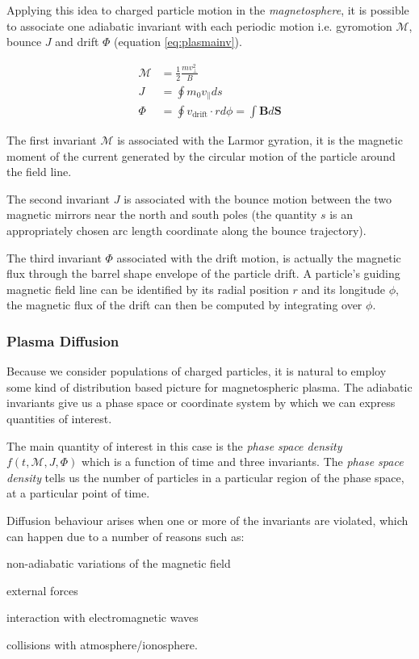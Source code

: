Applying this idea to charged particle motion in the \emph{magnetosphere}, it is possible to associate one 
adiabatic invariant with each periodic motion i.e. gyromotion $\mathcal{M}$, bounce $J$ and drift 
$\Phi$ (equation \ref{eq:plasmainv}). 

\begin{align}\label{eq:plasmainv}
    \mathcal{M} &= \frac{1}{2}\frac{mv^{2}_{\perp}}{B} \\
    J &= \oint{m_0 v_{\parallel}ds} \\
    \Phi &= \oint{v_{\text{drift}} \cdot r d\phi} = \int{\mathbf{B} d\mathbf{S}}
\end{align}


The first invariant $\mathcal{M}$ is associated with the Larmor gyration, it is the magnetic moment of the 
current generated by the circular motion of the particle around the field line. 

The second invariant $J$ is associated with the bounce motion between the two magnetic mirrors near the north and 
south poles (the quantity $s$ is an appropriately chosen arc length coordinate along the bounce trajectory). 

The third invariant $\Phi$ associated with the drift motion, is actually the magnetic flux through the barrel 
shape envelope of the particle drift. A particle's guiding magnetic field line can be identified by its radial 
position $r$ and its longitude $\phi$, the magnetic flux of the drift can then be computed by integrating over 
$\phi$.

\subsubsection*{Plasma Diffusion}

Because we consider populations of charged particles, it is natural to employ some kind of distribution based 
picture for magnetospheric plasma. The adiabatic invariants give us a phase space or coordinate system by which 
we can express quantities of interest. 

The main quantity of interest in this case is the \emph{phase space density} $f(t, \mathcal{M}, J, \Phi)$ which 
is a function of time and three invariants. The \emph{phase space density} tells us the number of particles in 
a particular region of the phase space, at a particular point of time.

Diffusion behaviour arises when one or more of the invariants are violated, which can happen due to a number of 
reasons such as: 
\begin{enumerate*}
    \item non-adiabatic variations of the magnetic field 
    \item external forces
    \item interaction with electromagnetic waves
    \item collisions with atmosphere/ionosphere. 
\end{enumerate*}

